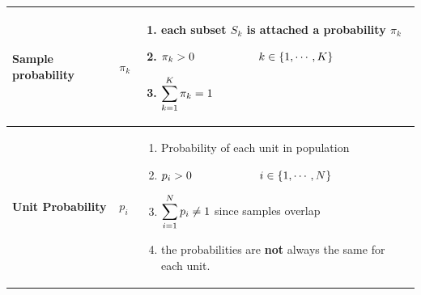 \begin{customArrayStretch}{1.3}
\begin{longtable}{>{\RaggedRight\arraybackslash}p{4cm} >{\centering\arraybackslash}p{0.5cm} p{10.5cm}}
\textbf{Sample probability} &
    $\pi_k$ &
    \begin{minipage}{10.3cm}
        \vspace{0.15cm}
        \begin{enumerate}
            \item each subset $S_k$ is attached a probability $\pi_k$
            \hfill \cite{statistics/book/Statistics-for-Data-Scientists/Maurits-Kaptein}
            
            \item $\pi_k > 0 \hspace{2cm}  k \in \left\{1,\cdots,K\right\}$
            \hfill \cite{statistics/book/Statistics-for-Data-Scientists/Maurits-Kaptein}
            
            \item $\displaystyle\sum_{k=1}^K \pi_k = 1$
            \hfill \cite{statistics/book/Statistics-for-Data-Scientists/Maurits-Kaptein}
        \end{enumerate}
        \vspace{0.15cm}
    \end{minipage} 
    \\ \hline


\textbf{Unit Probability} &
    $p_i$ &
    \begin{minipage}{10.3cm}
        \vspace{0.15cm}
        \begin{enumerate}
            \item Probability of each unit in population
            \hfill \cite{statistics/book/Statistics-for-Data-Scientists/Maurits-Kaptein}
            
            \item $p_i > 0 \hspace{2cm} \ i \in \left\{1,\cdots,N\right\}$
            \hfill \cite{statistics/book/Statistics-for-Data-Scientists/Maurits-Kaptein}

            \item $\displaystyle\sum_{i=1}^N p_i \neq 1$ since samples overlap
            \hfill \cite{statistics/book/Statistics-for-Data-Scientists/Maurits-Kaptein}

            \item the probabilities are \textbf{not} always the same for each unit.
            \hfill \cite{statistics/book/Statistics-for-Data-Scientists/Maurits-Kaptein}

        \end{enumerate}
        \vspace{0.15cm}
    \end{minipage} 
    \\ \hline



\end{longtable}
\end{customArrayStretch}

